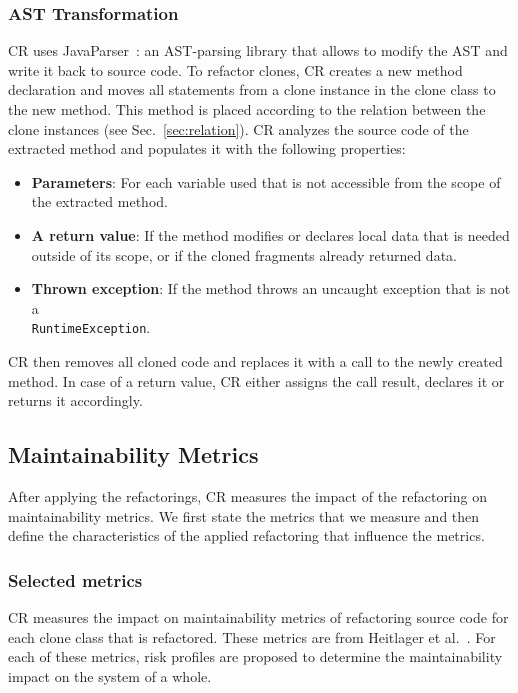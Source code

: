 \documentclass[sigconf,review,anonymous]{acmart}
\begin{document}
\subsubsection{AST Transformation}
CR uses JavaParser~\cite{smith2017javaparser}: an AST-parsing library that allows to modify the AST and write it back to source code. To refactor clones, CR creates a new method declaration and moves all statements from a clone instance in the clone class to the new method. This method is placed according to the relation between the clone instances (see Sec.~\ref{sec:relation}). CR analyzes the source code of the extracted method and populates it with the following properties:
\begin{itemize}
  \item \textbf{Parameters}: For each variable used that is not accessible from the scope of the extracted method.
  \item \textbf{A return value}: If the method modifies or declares local data that is needed outside of its scope, or if the cloned fragments already returned data.
  \item \textbf{Thrown exception}: If the method throws an uncaught exception that is not a \\ \texttt{RuntimeException}.
\end{itemize}
CR then removes all cloned code and replaces it with a call to the newly created method. In case of a return value, CR either assigns the call result, declares it or returns it accordingly.

\subsection{Maintainability Metrics}
After applying the refactorings, CR measures the impact of the refactoring on maintainability metrics. We first state the metrics that we measure and then define the characteristics of the applied refactoring that influence the metrics.

\subsubsection{Selected metrics} \label{sec:metrics}
CR measures the impact on maintainability metrics of refactoring source code for each clone class that is refactored. These metrics are from Heitlager et al.~\cite{heitlager2007practical}. For each of these metrics, risk profiles are proposed to determine the maintainability impact on the system of a whole.
\end{document}
